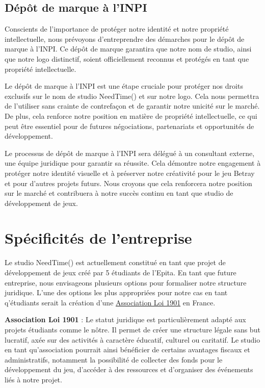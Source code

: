 \documentclass[
	article,			%
	11pt,				%
	oneside,			%
	a4paper,			%
	chapter=TITLE,
	french,			%
	sumario=tradicional
	]{base_nt}
\begin{document}
\subsection{Dépôt de marque à l'INPI}

Conscients de l'importance de protéger notre identité et notre propriété intellectuelle, nous prévoyons d'entreprendre des démarches pour le dépôt de marque à l'INPI. Ce dépôt de marque garantira que notre nom de studio, ainsi que notre logo distinctif, soient officiellement reconnus et protégés en tant que propriété intellectuelle.

Le dépôt de marque à l'INPI est une étape cruciale pour protéger nos droits exclusifs sur le nom de studio NeedTime() et sur notre logo. Cela nous permettra de l'utiliser sans crainte de contrefaçon et de garantir notre unicité sur le marché. De plus, cela renforce notre position en matière de propriété intellectuelle, ce qui peut être essentiel pour de futures négociations, partenariats et opportunités de développement.

Le processus de dépôt de marque à l'INPI sera délégué à un consultant externe, une équipe juridique pour garantir sa réussite. Cela démontre notre engagement à protéger notre identité visuelle et à préserver notre créativité pour le jeu Betray et pour d'autres projets futurs. Nous croyons que cela renforcera notre position sur le marché et contribuera à notre succès continu en tant que studio de développement de jeux.

\section{Spécificités de l'entreprise}

Le studio NeedTime() est actuellement constitué en tant que projet de développement de jeux créé par 5 étudiants de l'Epita. En tant que future entreprise, nous envisageons plusieurs options pour formaliser notre structure juridique. L'une des options les plus appropriées pour notre cas en tant q'étudiants serait la création d'une \href{https://fr.wikipedia.org/wiki/Association_loi_de_1901}{Association Loi 1901} en France.

\textbf{Association Loi 1901} : Le statut juridique est particulièrement adapté aux projets étudiants comme le nôtre. Il permet de créer une structure légale sans but lucratif, axée sur des activités à caractère éducatif, culturel ou caritatif. Le studio en tant qu'association pourrait ainsi bénéficier de certains avantages fiscaux et administratifs, notamment la possibilité de collecter des fonds pour le développement du jeu, d'accéder à des ressources et d'organiser des événements liés à notre projet.
\end{document}
